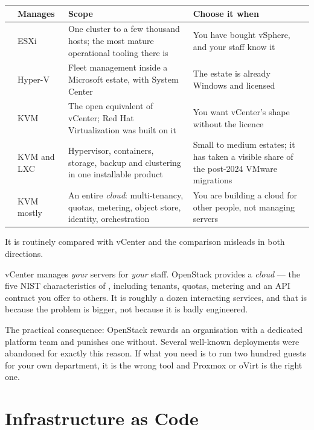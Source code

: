 \begin{longtable}{@{}L{2.5cm}L{3.0cm}L{4.4cm}L{4.5cm}@{}}
\toprule
{}
& \textbf{Manages} & \textbf{Scope} & \textbf{Choose it when} \\
\midrule
\endhead
{} & ESXi & One cluster to a few thousand hosts; the most mature
operational tooling there is & You have bought vSphere, and your staff know it \\
 & Hyper-V & Fleet management inside a Microsoft estate, with
System Center & The estate is already Windows and licensed \\
 & KVM & The open equivalent of vCenter; Red Hat Virtualization was
built on it & You want vCenter's shape without the licence \\
 & KVM and LXC & Hypervisor, containers, storage, backup and
clustering in one installable product & Small to medium estates; it has taken a
visible share of the post-2024 VMware migrations \\
 & KVM mostly & An entire \emph{cloud}: multi-tenancy, quotas,
metering, object store, identity, orchestration & You are building a cloud for
other people, not managing servers \\
\bottomrule
\end{longtable}

\begin{alertbox}
It is routinely compared with vCenter and the comparison misleads in both
directions.

\smallskip
vCenter manages \emph{your} servers for \emph{your} staff. OpenStack provides a
\emph{cloud} --- the five NIST characteristics of , including
tenants, quotas, metering and an API contract you offer to others. It is
roughly a dozen interacting services, and that is because the problem is
bigger, not because it is badly engineered.

\smallskip
The practical consequence: OpenStack rewards an organisation with a dedicated
platform team and punishes one without. Several well-known deployments were
abandoned for exactly this reason. If what you need is to run two hundred
guests for your own department, it is the wrong tool and Proxmox or oVirt is
the right one.
\end{alertbox}

\section{Infrastructure as Code}

